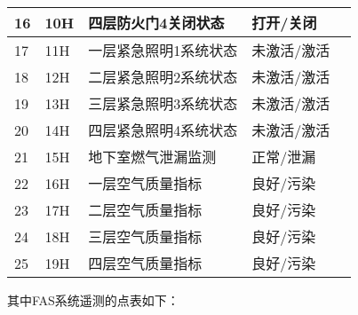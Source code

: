 \begin{longtable}[c]{|l|l|l|l|l|}
	16          & 10H            & 四层防火门4关闭状态     & 打开/关闭       &             \\ \hline
	17          & 11H            & 一层紧急照明1系统状态    & 未激活/激活      &             \\ \hline
	18          & 12H            & 二层紧急照明2系统状态    & 未激活/激活      &             \\ \hline
	19          & 13H            & 三层紧急照明3系统状态    & 未激活/激活      &             \\ \hline
	20          & 14H            & 四层紧急照明4系统状态    & 未激活/激活      &             \\ \hline
	21          & 15H            & 地下室燃气泄漏监测      & 正常/泄漏       &             \\ \hline
	22          & 16H            & 一层空气质量指标       & 良好/污染       &             \\ \hline
	23          & 17H            & 二层空气质量指标       & 良好/污染       &             \\ \hline
	24          & 18H            & 三层空气质量指标       & 良好/污染       &             \\ \hline
	25          & 19H            & 四层空气质量指标       & 良好/污染       &             \\ \hline
\end{longtable}

其中FAS系统遥测的点表如下：

